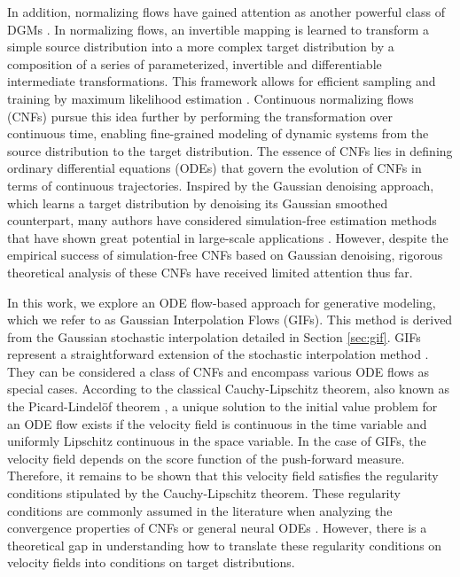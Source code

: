 \documentclass[twoside,11pt]{article}
\numberwithin{equation}{section}
\begin{document}
In addition, normalizing flows have gained attention as another powerful class of DGMs \citep{tabak2010density, tabak2013family, kobyzev2020normalizing, papamakarios2021normalizing}.
In normalizing flows, an invertible mapping is learned to transform a simple source distribution into a more complex target distribution by a composition of a series of parameterized, invertible and differentiable intermediate transformations. This framework allows for efficient sampling and training by maximum likelihood estimation \citep{dinh2014nice, rezende2015variational}. Continuous normalizing flows (CNFs) pursue this idea further by performing the transformation over continuous time, enabling fine-grained modeling of dynamic systems from the source distribution to the target distribution. The essence of CNFs lies in defining ordinary differential equations (ODEs) that govern the evolution of CNFs in terms of continuous trajectories. Inspired by the Gaussian denoising approach, which learns a target distribution by denoising its Gaussian smoothed counterpart,
many authors have considered simulation-free estimation methods that have shown great potential in large-scale applications \citep{song2021denoising, liu2023flow, albergo2023building, lipman2023flow, neklyudov2023action, tong2023conditional, chen2023riemannian, albergo2023stochastic, shaul2023kinetic, pooladian2023multisample}. However, despite the empirical success of simulation-free CNFs based on Gaussian denoising, rigorous theoretical analysis of these CNFs have received limited attention thus far.

In this work, we explore an ODE flow-based approach for generative modeling, which we refer to as Gaussian Interpolation Flows (GIFs). This method is derived from the Gaussian stochastic interpolation detailed in Section \ref{sec:gif}. GIFs represent a straightforward extension of the stochastic interpolation method \citep{albergo2023building, liu2023flow, lipman2023flow}. They can be considered a class of CNFs and encompass various ODE flows as special cases.
According to the classical Cauchy-Lipschitz theorem, also known as the Picard-Lindelöf theorem \cite[Theorem 1.1]{hartman2002existence}, a unique solution to the initial value problem for an ODE flow exists if the velocity field is continuous in the time variable and uniformly Lipschitz continuous in the space variable. In the case of GIFs, the velocity field depends on the score function of the push-forward measure. Therefore, it remains to be shown that this velocity field satisfies the regularity conditions stipulated by the Cauchy-Lipschitz theorem.
These regularity conditions are commonly assumed in the literature when analyzing the convergence properties of CNFs or general neural ODEs \citep{chen2018neural, bilovs2021neural, marion2023implicit, marion2023generalization, marzouk2023distribution}. However, there is a theoretical gap in understanding how to translate these regularity conditions on velocity fields into conditions on target distributions.
\end{document}
